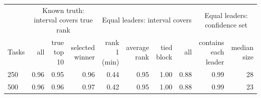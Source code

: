 \begin{tabular}{lrrrrrrrrr}
\toprule
 & \multicolumn{3}{c}{Known truth: interval covers true rank} & \multicolumn{4}{c}{Equal leaders: interval covers} & \multicolumn{2}{c}{Equal leaders: confidence set} \\
Tasks & all & true top 10 & selected winner & rank 1 (min) & average rank & tied block & all & contains each leader & median size \\
\midrule
250 & 0.96 & 0.95 & 0.96 & 0.44 & 0.95 & 1.00 & 0.88 & 0.99 & 28 \\
500 & 0.96 & 0.96 & 0.97 & 0.42 & 0.95 & 1.00 & 0.88 & 0.99 & 23 \\
\bottomrule
\end{tabular}
